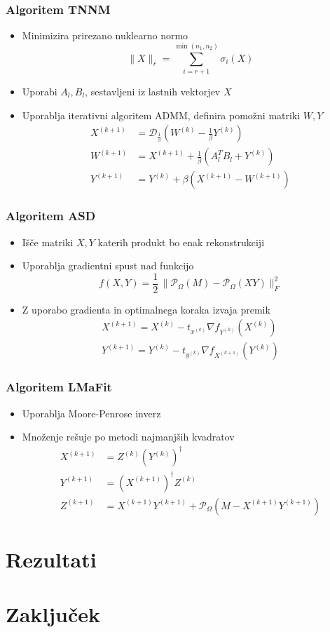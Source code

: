 \documentclass{beamer}
\newcommand{\fnorm}[1]{\lVert#1\rVert_F}
\newcommand{\norm}[1]{\lVert#1\rVert}
\newcommand{\proj}{\mathcal{P}_\Omega}
\newcommand{\shrink}{\mathcal{D}}
\begin{document}
\begin{frame}
  \frametitle{Algoritem TNNM}
  \begin{itemize}
    \item Minimizira \alert{prirezano nuklearno normo} \[
      \norm{X}_r = \sum_{i = r + 1}^{\min(n_1, n_2)} \sigma_i(X)
    \]
    \item Uporabi $A_l, B_l$, sestavljeni iz lastnih vektorjev $X$ 
    \item Uporablja iterativni algoritem ADMM, definira pomožni matriki $W, Y$ 
    \begin{align*}
        X^{(k+1)} &= \shrink_\frac{1}{\beta}(W^{(k)} - \frac{1}{\beta} Y^{(k)})\\
        W^{(k+1)} &= X^{(k+1)} + \frac{1}{\beta}(A_l^T B_l + Y^{(k)})\\
        Y^{(k+1)} &= Y^{(k)} + \beta(X^{(k+1)}- W^{(k+1)})
      \end{align*}
  \end{itemize}
\end{frame}

\begin{frame}
  \frametitle{Algoritem ASD}
  \begin{itemize}
    \item Išče matriki $X, Y$ katerih produkt bo enak rekonstrukciji
    \item Uporablja \alert{gradientni spust} nad funkcijo \[
      f(X, Y) = \frac{1}{2}\, \fnorm{\proj(M) - \proj(XY)}^2  
    \]
    \item Z uporabo gradienta in optimalnega koraka izvaja premik 
    \begin{align*}
      X^{(k+1)} = X^{(k)} - t_{x^{(k)}} \nabla f_{Y^{(k)}}(X^{(k)}) \\
      Y^{(k+1)} = Y^{(k)} - t_{y^{(k)}} \nabla f_{X^{(k+1)}}(Y^{(k)})
  \end{align*}
  \end{itemize}
\end{frame}

\begin{frame}
  \frametitle{Algoritem LMaFit}
  \begin{itemize}
    \item Uporablja Moore-Penrose inverz
    \item Množenje rešuje po metodi najmanjših kvadratov
    \begin{align*}
      X^{(k+1)} &= Z^{(k)}(Y^{(k)})^\dagger \\
      Y^{(k+1)} &= (X^{(k+1)})^\dagger Z^{(k)} \\
      Z^{(k+1)} &= X^{(k+1)}Y^{(k+1)} + \proj(M - X^{(k+1)}Y^{(k+1)})
    \end{align*}
  \end{itemize}
\end{frame}


\section{Rezultati}
\section{Zaključek}
\end{document}
